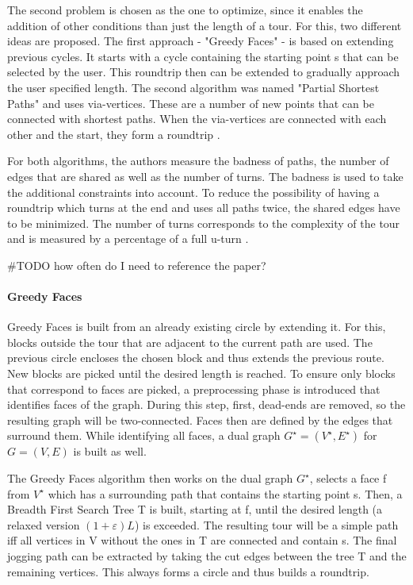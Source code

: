 The second problem is chosen as the one to optimize, since it enables the addition of other conditions than just the length of a tour.
For this, two different ideas are proposed.
The first approach - "Greedy Faces" - is based on extending previous cycles.
It starts with a cycle containing the starting point s that can be selected by the user. 
This roundtrip then can be extended to gradually approach the user specified length. 
The second algorithm was named "Partial Shortest Paths" and uses via-vertices.
These are a number of new points that can be connected with shortest paths.
When the via-vertices are connected with each other and the start, they form a roundtrip \cite{gemsaEfficientComputationJogging2013}.


For both algorithms, the authors measure the badness of paths, the number of edges that are shared as well as the number of turns.
The badness is used to take the additional constraints into account. 
To reduce the possibility of having a roundtrip which turns at the end and uses all paths twice, the shared edges have to be minimized.
The number of turns corresponds to the complexity of the tour and is measured by a percentage of a full u-turn \cite{gemsaEfficientComputationJogging2013}. 

\#TODO how often do I need to reference the paper?


\paragraph{Greedy Faces}

Greedy Faces is built from an already existing circle by extending it.
For this, blocks outside the tour that are adjacent to the current path are used.
The previous circle encloses the chosen block and thus extends the previous route. 
New blocks are picked until the desired length is reached.
To ensure only blocks that correspond to faces are picked, a preprocessing phase is introduced that identifies faces of the graph.
During this step, first, dead-ends are removed, so the resulting graph will be two-connected.
Faces then are defined by the edges that surround them. 
While identifying all faces, a dual graph $G^{\star} = (V^{\star},E^{\star})$ for $G = (V,E)$ is built as well.

The Greedy Faces algorithm then works on the dual graph $G^{\star}$, selects a face f from $V^{\star}$ which has a surrounding path that contains the starting point s. 
Then, a Breadth First Search Tree T is built, starting at f, until the desired length (a relaxed version $(1 + \varepsilon) L$) is exceeded.
The resulting tour will be a simple path iff all vertices in V without the ones in T are connected and contain s.
The final jogging path can be extracted by taking the cut edges between the tree T and the remaining vertices.
This always forms a circle and thus builds a roundtrip.

